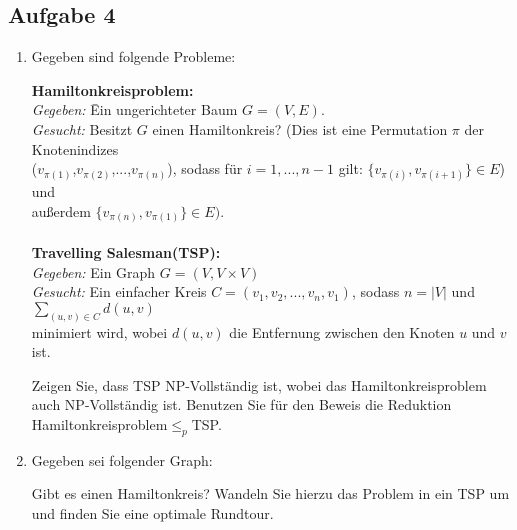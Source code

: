 \documentclass[10pt,oneside,onecolumn,a4paper,german,titlepage]{article}
\begin{document}
\subsection*{Aufgabe 4}
\begin{enumerate}
 \item Gegeben sind folgende Probleme: 
 \begin{tabbing}
 \textbf{Hamiltonkreisproblem:} \\
 \hspace{10pt} \= \textit{Gegeben:} \= Ein ungerichteter Baum $G=(V,E)$.\\
 \> \textit{Gesucht:} \> Besitzt $G$ einen Hamiltonkreis? (Dies ist eine Permutation $\pi$ der Knotenindizes\\ 
 \> \> ($v_{\pi(1)}$,$v_{\pi(2)}$,...,$v_{\pi(n)}$), sodass für $i=1,...,n-1$ gilt: $\{v_{\pi(i)},v_{\pi(i+1)}\}\in E$) und \\ 
 \> \> außerdem $\{v_{\pi(n)},v_{\pi(1)}\} \in E)$.\\ \\
 \textbf{Travelling Salesman(TSP):}\\
 \> \textit{Gegeben:} Ein Graph $G=(V,V \times V)$\\
 \> \textit{Gesucht:} \> Ein einfacher Kreis $C=(v_1,v_2,...,v_n,v_1)$, sodass $n=|V|$ und $\sum_{(u,v)\in C} d(u,v)$\\
 \> \> minimiert wird, wobei $d(u,v)$ die Entfernung zwischen den Knoten $u$ und $v$ ist.\\
\end{tabbing}
Zeigen Sie, dass TSP NP-Vollständig ist, wobei das Hamiltonkreisproblem auch NP-Vollständig ist. Benutzen Sie für den Beweis die Reduktion Hamiltonkreisproblem$\leq_p$TSP. 
\item Gegeben sei folgender Graph:\newline
\begin{center}
\end{center}
Gibt es einen Hamiltonkreis? Wandeln Sie hierzu das Problem in ein TSP um und finden Sie eine optimale Rundtour.
\end{enumerate}
\end{document}
